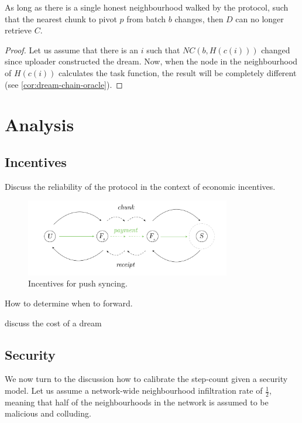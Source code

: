 \begin{theorem}
\label{the:revoking}

As long as there is a single honest neighbourhood walked by the protocol, such that the nearest chunk to pivot $p$ from batch $b$ changes, then $D$ can no longer retrieve $C$.

\begin{proof}
Let us assume that there is an $i$ such that $\mathit{NC}(b,H(c(i)))$ changed since uploader constructed the dream. Now, when the node in the neighbourhood of $H(c(i))$ calculates the task function, the result will be completely different (see \ref{cor:dream-chain-oracle}). \qedsymbol
\end{proof}
\end{theorem}

\section{Analysis}

\subsection{Incentives}

Discuss the reliability of the protocol in the context of economic incentives.
\begin{figure}[htbp]
  \centering
    \includegraphics[width=0.8\textwidth]{figs/push-payment.pdf}
  \caption{Incentives for push syncing.}
\label{fig:push-payment}
\end{figure}



How to determine when to forward.

discuss the cost of a dream
\subsection{Security}

We now turn to the discussion how to calibrate the step-count given a security model. Let us assume a network-wide neighbourhood infiltration rate of $\frac{1}{2}$, meaning that  half of the neighbourhoods in the network is assumed  to be  malicious and colluding. 

